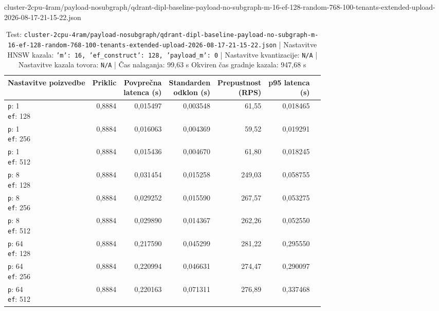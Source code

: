 \begin{table}[htbp]
  \centering
\small
  \caption{cluster-2cpu-4ram/payload-nosubgraph/qdrant-dipl-baseline-payload-no-subgraph-m-16-ef-128-random-768-100-tenants-extended-upload-2026-08-17-21-15-22.json}
  \label{tab:cluster-2cpu-4ram:payload-nosubgraph:qdrant-dipl-baseline-payload-no-subgraph-m-16-ef-128-random-768-100-tenants-extended-upload-2026-08-17-21-15-22.json}
  \begin{tabularx}{\textwidth}{Xrrrrrr}
    \toprule
    Nastavitve poizvedbe & Priklic & \makecell{Povprečna\\latenca (s)} & \makecell{Standarden\\odklon (s)} & \makecell{Prepustnost\\(RPS)} & \makecell{p95 latenca\\(s)}  \\
    \midrule
    \makecell{\texttt{p}: 1\\\texttt{ef}: 128} & 0,8884 & 0,015497 & 0,003548 & 61,55 & 0,018465 \\
    \makecell{\texttt{p}: 1\\\texttt{ef}: 256} & 0,8884 & 0,016063 & 0,004369 & 59,52 & 0,019291 \\
    \makecell{\texttt{p}: 1\\\texttt{ef}: 512} & 0,8884 & 0,015436 & 0,004670 & 61,80 & 0,018245 \\
    \makecell{\texttt{p}: 8\\\texttt{ef}: 128} & 0,8884 & 0,031454 & 0,015258 & 249,03 & 0,058755 \\
    \makecell{\texttt{p}: 8\\\texttt{ef}: 256} & 0,8884 & 0,029252 & 0,015590 & 267,57 & 0,053275 \\
    \makecell{\texttt{p}: 8\\\texttt{ef}: 512} & 0,8884 & 0,029890 & 0,014367 & 262,26 & 0,052550 \\
    \makecell{\texttt{p}: 64\\\texttt{ef}: 128} & 0,8884 & 0,217590 & 0,045299 & 281,22 & 0,295550 \\
    \makecell{\texttt{p}: 64\\\texttt{ef}: 256} & 0,8884 & 0,220994 & 0,046631 & 274,47 & 0,290097 \\
    \makecell{\texttt{p}: 64\\\texttt{ef}: 512} & 0,8884 & 0,220163 & 0,071311 & 276,89 & 0,337468 \\
    \bottomrule
  \end{tabularx}
\caption* {Test: \texttt{cluster-2cpu-4ram/payload-nosubgraph/qdrant-dipl-baseline-payload-no-subgraph-m-16-ef-128-random-768-100-tenants-extended-upload-2026-08-17-21-15-22.json} | Nastavitve HNSW kazala: \texttt{{'m': 16, 'ef\_construct': 128, 'payload\_m': 0}} | Nastavitve kvantizacije: \texttt{N/A} | Nastavitve kazala tovora: \texttt{N/A} | Čas nalaganja: 99,63 s Okviren čas gradnje kazala: 947,68 s}\end{table}


